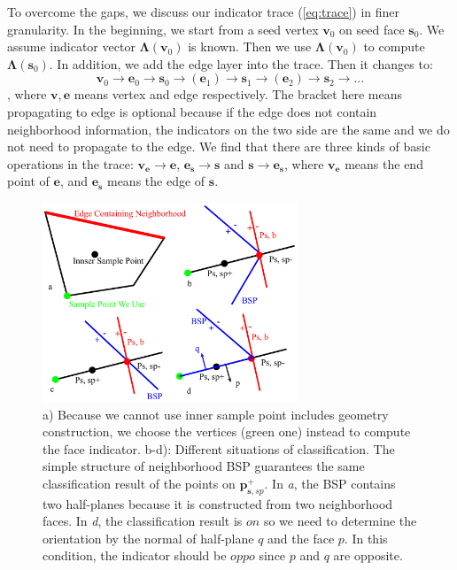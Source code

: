 \documentclass[10pt,journal,compsoc]{IEEEtran}
\begin{document}
To overcome the gaps, we discuss our indicator trace (\ref{eq:trace}) in finer granularity. In the beginning, we start from a seed vertex $\bm{v}_0$ on seed face $\bm{s}_0$. We assume indicator vector $\bm{\Lambda}(\bm{v}_0)$ is known. Then we use $\bm{\Lambda}(\bm{v}_0)$ to compute $\bm{\Lambda}(\bm{s}_0)$. In addition, we add the edge layer into the trace. Then it changes to:
\begin{equation}
\bm{v}_0\to \bm{e}_0\to \bm{s}_0\to (\bm{e}_1)\to \bm{s}_1\to (\bm{e}_2)\to \bm{s}_2\to ...
\end{equation}
, where $\bm{v}, \bm{e}$ means vertex and edge respectively. The bracket here means propagating to edge is optional because if the edge does not contain neighborhood information, the indicators on the two side are the same and we do not need to propagate to the edge. We find that there are three kinds of basic operations in the trace: $\bm{v}_{\bm{e}}\to \bm{e}$, $\bm{e}_{\bm{s}}\to \bm{s}$ and $\bm{s}\to \bm{e}_{\bm{s}}$, where $\bm{v}_{\bm{e}}$ means the end point of $\bm{e}$, and $\bm{e}_{\bm{s}}$ means the edge of $\bm{s}$.

\begin{figure}[t]
\centering
\includegraphics[width=3in]{bsps}
\caption{a) Because we cannot use inner sample point includes geometry construction, we choose the vertices (green one) instead to compute the face indicator. b-d): Different situations of classification. The simple structure of neighborhood BSP guarantees the same classification result of the points on $\bm{p}_{\bm{s}, sp}^+$. In \emph{a}, the BSP contains two half-planes because it is constructed from two neighborhood faces. In \emph{d}, the classification result is $on$ so we need to determine the orientation by the normal of half-plane $q$ and the face $p$. In this condition, the indicator should be $oppo$ since $p$ and $q$ are opposite.}
\label{fig:bsps}
\end{figure}
\end{document}
